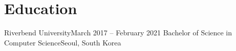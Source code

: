 \section{Education}
\resumeSubHeadingListStart
    \resumeSubheading
      {Riverbend University}{March 2017 -- February 2021}
      {Bachelor of Science in Computer Science}{Seoul, South Korea}
\resumeSubHeadingListEnd
